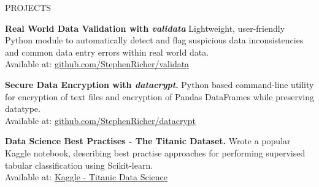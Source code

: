 \documentclass{cv} %
\begin{document}
\begin{rSection}{PROJECTS}
\vspace{-1.25em}
\item \textbf{Real World Data Validation with \textit{validata}} {Lightweight, user-friendly Python module to automatically detect and flag suspicious data inconsistencies and common data entry errors within real world data. \\
Available at: \href{https://github.com/StephenRicher/validata}{github.com/StephenRicher/validata}}
\item \textbf{Secure Data Encryption with \textit{datacrypt}.} {Python based command-line utility for encryption of text files and encryption of Pandas DataFrames while preserving datatype. \\
Available at: \href{https://github.com/StephenRicher/datacrypt}{github.com/StephenRicher/datacrypt}}
\item \textbf{Data Science Best Practises - The Titanic Dataset.} {Wrote a popular Kaggle notebook, describing best practise approaches for performing supervised tabular classification using Scikit-learn. \\
Available at: \href{https://www.kaggle.com/code/stever4/titanic-top-5-good-data-science-practices}{Kaggle - Titanic Data Science}}
\end{rSection} 

\end{document}
